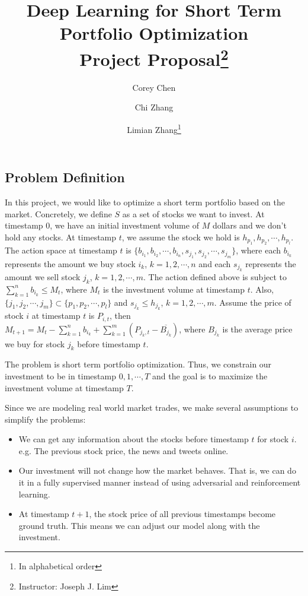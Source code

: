 \documentclass[a4paper, 11pt]{article}
\title{\textbf{Deep Learning for Short Term Portfolio Optimization}\\Project Proposal\thanks{Instructor: Joseph J. Lim}}
\author[]{Corey Chen}
\author[]{Chi Zhang}
\author[]{Limian Zhang\footnote{In alphabetical order}}
\affil[]{Department of Computer Science}
\begin{document}
  \maketitle                     %
  \begin{spacing}{1}
    \section{Problem Definition}
    In this project, we would like to optimize a short term portfolio based on the market. Concretely, we define $S$ as a set of stocks we want to invest. At timestamp 0, we have an initial investment volume of $M$ dollars and we don't hold any stocks. At timestamp $t$, we assume the stock we hold is $h_{p_1}, h_{p_2}, \cdots, h_{p_l}$. The action space at timestamp $t$ is $\{b_{i_1}, b_{i_2},\cdots, b_{i_n}, s_{j_1}, s_{j_2}, \cdots, s_{j_m}\}$, where each $b_{i_k}$ represents the amount we buy stock $i_k$, $k=1, 2, \cdots, n$ and each $s_{j_k}$ represents the amount we sell stock $j_k$, $k=1, 2, \cdots, m$. The action defined above is subject to $\sum_{k=1}^{n}b_{i_k}\leq M_t$, where $M_t$ is the investment volume at timestamp $t$. Also, $\{j_1, j_2, \cdots, j_m\}\subset\{p_1, p_2, \cdots, p_l\}$ and $s_{j_k}\leq h_{j_k}$, $k=1, 2, \cdots, m$. Assume the price of stock $i$ at timestamp $t$ is $P_{i, t}$, then $M_{t+1} = M_{t} - \sum_{k=1}^{n}b_{i_k} + \sum_{k=1}^{m}(P_{j_k, t} - \overline{B_{j_k}})$, where $B_{j_k}$ is the average price we buy for stock $j_k$ before timestamp $t$. 
    
    The problem is short term portfolio optimization. Thus, we constrain our investment to be in timestamp $0, 1, \cdots, T$ and the goal is to maximize the investment volume at timestamp $T$.
    
    Since we are modeling real world market trades, we make several assumptions to simplify the problems:
    \begin{itemize}
      \item We can get any information about the stocks before timestamp $t$ for stock $i$. e.g. The previous stock price, the news and tweets online.
      \item Our investment will not change how the market behaves. That is, we can do it in a fully supervised manner instead of using adversarial and reinforcement learning.
      \item At timestamp $t+1$, the stock price of all previous timestamps become ground truth. This means we can adjust our model along with the investment.
    \end{itemize}
    

\end{spacing}
\end{document}
